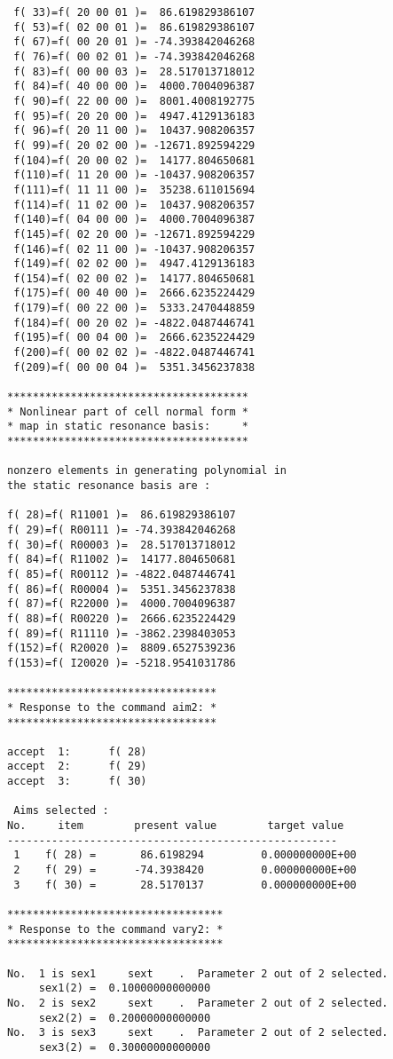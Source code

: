 \begin{footnotesize}
\begin{verbatim}
 f( 33)=f( 20 00 01 )=  86.619829386107
 f( 53)=f( 02 00 01 )=  86.619829386107
 f( 67)=f( 00 20 01 )= -74.393842046268
 f( 76)=f( 00 02 01 )= -74.393842046268
 f( 83)=f( 00 00 03 )=  28.517013718012
 f( 84)=f( 40 00 00 )=  4000.7004096387
 f( 90)=f( 22 00 00 )=  8001.4008192775
 f( 95)=f( 20 20 00 )=  4947.4129136183
 f( 96)=f( 20 11 00 )=  10437.908206357
 f( 99)=f( 20 02 00 )= -12671.892594229
 f(104)=f( 20 00 02 )=  14177.804650681
 f(110)=f( 11 20 00 )= -10437.908206357
 f(111)=f( 11 11 00 )=  35238.611015694
 f(114)=f( 11 02 00 )=  10437.908206357
 f(140)=f( 04 00 00 )=  4000.7004096387
 f(145)=f( 02 20 00 )= -12671.892594229
 f(146)=f( 02 11 00 )= -10437.908206357
 f(149)=f( 02 02 00 )=  4947.4129136183
 f(154)=f( 02 00 02 )=  14177.804650681
 f(175)=f( 00 40 00 )=  2666.6235224429
 f(179)=f( 00 22 00 )=  5333.2470448859
 f(184)=f( 00 20 02 )= -4822.0487446741
 f(195)=f( 00 04 00 )=  2666.6235224429
 f(200)=f( 00 02 02 )= -4822.0487446741
 f(209)=f( 00 00 04 )=  5351.3456237838

**************************************
* Nonlinear part of cell normal form *
* map in static resonance basis:     *
**************************************

nonzero elements in generating polynomial in
the static resonance basis are :

f( 28)=f( R11001 )=  86.619829386107
f( 29)=f( R00111 )= -74.393842046268
f( 30)=f( R00003 )=  28.517013718012
f( 84)=f( R11002 )=  14177.804650681
f( 85)=f( R00112 )= -4822.0487446741
f( 86)=f( R00004 )=  5351.3456237838
f( 87)=f( R22000 )=  4000.7004096387
f( 88)=f( R00220 )=  2666.6235224429
f( 89)=f( R11110 )= -3862.2398403053
f(152)=f( R20020 )=  8809.6527539236
f(153)=f( I20020 )= -5218.9541031786

*********************************
* Response to the command aim2: *
*********************************

accept  1:      f( 28)
accept  2:      f( 29)
accept  3:      f( 30)

 Aims selected :
No.     item        present value        target value
----------------------------------------------------
 1    f( 28) =       86.6198294         0.000000000E+00
 2    f( 29) =      -74.3938420         0.000000000E+00
 3    f( 30) =       28.5170137         0.000000000E+00

**********************************
* Response to the command vary2: *
**********************************

No.  1 is sex1     sext    .  Parameter 2 out of 2 selected.
     sex1(2) =  0.10000000000000
No.  2 is sex2     sext    .  Parameter 2 out of 2 selected.
     sex2(2) =  0.20000000000000
No.  3 is sex3     sext    .  Parameter 2 out of 2 selected.
     sex3(2) =  0.30000000000000


\end{verbatim}
\end{footnotesize}
